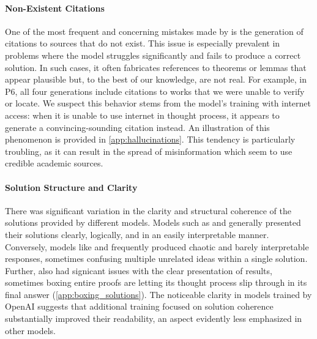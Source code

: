 \paragraph{Non-Existent Citations} One of the most frequent and concerning mistakes made by \geminipro{} is the generation of citations to sources that do not exist. This issue is especially prevalent in problems where the model struggles significantly and fails to produce a correct solution. In such cases, it often fabricates references to theorems or lemmas that appear plausible but, to the best of our knowledge, are not real. For example, in P6, all four generations include citations to works that we were unable to verify or locate. We suspect this behavior stems from the model's training with internet access: when it is unable to use internet in thought process, it appears to generate a convincing-sounding citation instead. An illustration of this phenomenon is provided in \cref{app:hallucinations}. This tendency is particularly troubling, as it can result in the spread of misinformation which seem to use credible academic sources.

\vspace{-1mm}
\paragraph{Solution Structure and Clarity}
There was significant variation in the clarity and structural coherence of the solutions provided by different models. Models such as \othree{} and \oone{} generally presented their solutions clearly, logically, and in an easily interpretable manner. Conversely, models like \flthink{} and \qwq{} frequently produced chaotic and barely interpretable responses, sometimes confusing multiple unrelated ideas within a single solution. Further, \geminipro{} also had signicant issues with the clear presentation of results, sometimes boxing entire proofs are letting its thought process slip through in its final answer (\cref{app:boxing_solutions}). The noticeable clarity in models trained by OpenAI suggests that additional training focused on solution coherence substantially improved their readability, an aspect evidently less emphasized in other models.